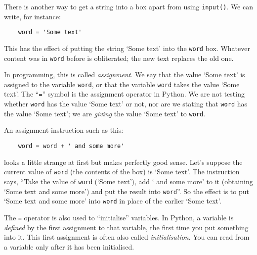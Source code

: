 There is another way to get a string into a box apart from using
\verb!input()!.  We can write, for instance:

\begin{Verbatim}
    word = 'Some text'
\end{Verbatim}

This has the effect of putting the string `Some text' into the
\verb!word! box.  Whatever content was in \verb!word! before is obliterated; the
new text replaces the old one. 

In programming, this is called \emph{assignment}.  We say that the
value `Some text' is
assigned to the variable \verb!word!, or that the variable \verb!word! takes the
value `Some text'.  The ``\texttt{=}'' symbol is the assignment operator in Python.  We are not
testing whether \verb!word! has the value `Some text' or not, nor are we stating that
\verb!word! has the value `Some text'; we are \emph{giving} the value
`Some text' to \verb!word!.

%

An assignment instruction such as this:

\begin{Verbatim}
    word = word + ' and some more'
\end{Verbatim}

looks a little strange at first but makes perfectly good sense.
Let's suppose the current value of \verb!word! (the contents of the
box) is `Some text'.
The instruction says, ``Take the value of \verb!word!
(`Some text'), add ` and some more'  to it (obtaining `Some text and some
more') 
and put the result into \verb!word!''.
So the effect is to put `Some text and some more' into \verb!word! in
place of the earlier `Some text'.




The \verb!=! operator is also used to ``initialise'' variables.
In Python, a variable is \emph{defined} by the first assignment to
that variable, the first time you put something into it. This first
assignment is often also called \emph{initialisation}.
You can read from a variable only after it has been initialised.

